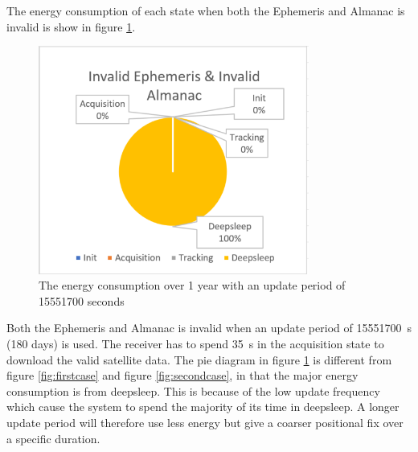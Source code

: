 The energy consumption of each state when both the Ephemeris and Almanac is invalid is show in figure \ref{fig:thirdcase}.

\begin{figure}[H]
\centering
\includegraphics[height=7.5cm]{Project_Report/Images/invalidinvalid.PNG}
\caption{The energy consumption over 1 year with an update period of 15551700 seconds}
\label{fig:thirdcase}
\end{figure}

 Both the Ephemeris and Almanac is invalid when an update period of 15551700 \,s (180 days) is used. The receiver has to spend 35 \,s in the acquisition state to download the valid satellite data. The pie diagram in figure \ref{fig:thirdcase} is different from figure \ref{fig:firstcase} and figure \ref{fig:secondcase}, in that the major energy consumption is from deepsleep. This is because of the low update frequency which cause the system to spend the majority of its time in deepsleep. A longer update period will therefore use less energy but give a coarser positional fix over a specific duration. 

\newpage